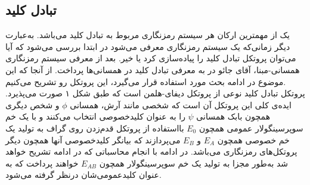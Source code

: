\subsection{تبادل کلید }\label{key_exchange}
یک از مهمترین ارکان هر سیستم رمزنگاری مربوط به تبادل کلید می‌باشد. به‌عبارت دیگر زمانی‌که یک سیستم رمزنگاری معرفی می‌شود در ابتدا بررسی می‌شود که آیا می‌توان پروتکل تبادل کلید را پیاده‌سازی کرد یا خیر. بعد از معرفی سیستم رمزنگاری همسانی-مبنا، آقای جائو در 
\cite{}
 به معرفی تبادل کلید در همسانی‌ها پرداخت. از آنجا که این موضوع در ادامه بحث مورد استفاده قرار می‌گیرد، این پروتکل رو تشریح می‌کنیم.
\\
 
پروتکل تبادل کلید نوعی از پروتکل دیفای-هلمن است که طبق شکل ۱ صورت می‌پذیرد. ایده‌ی کلی این پروتکل آن است که شخصی مانند آرش، همسانی 
$\phi$
و شخص دیگری همچون بابک همسانی 
$\psi$
را به عنوان کلیدخصوصی انتخاب می‌کنند و با یک خم سوپرسینگولار عمومی همچون
$E_0$
بااستفاده از پروتکل قدم‌زدن روی گراف به تولید یک خم خصوصی همچون
$E_A$
و
$E_B$
می‌پردازند که بیانگر کلیدخصوصی آنها همچون دیگر پروتکل‌های رمزنگاری می‌باشد. در ادامه با انجام محاسباتی که در ادامه تشریح خواهد شد به‌طور مجزا به تولید یک خم سوپرسینگولار همچون 
$E_{AB}$
خواهند پرداخت که به عنوان کلیدعمومی‌شان درنظر گرفته می‌شود.
\\
